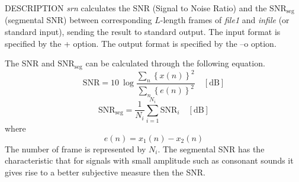 \begin{qsection}{DESCRIPTION}
{\em srn} calculates the SNR (Signal to Noise Ratio) 
and the $\mathrm{SNR}_{\mathrm{seg}}$ (segmental SNR) 
between corresponding $L$-length frames
of {\em file1} and {\em infile} (or standard input), 
sending the result to standard output.
The input format is specified by the + option.
The output format is specified by the --o option.

The SNR and $\mathrm{SNR}_{\mathrm{seg}}$ can be calculated
through the following equation.
\begin{displaymath}
\mathrm{SNR} = 10~\log \frac{\displaystyle\sum_{n} \left\{ x(n) \right\}^{2}}
{\displaystyle\sum_{n} \left\{ e(n) \right\}^{2}} \quad \mathrm{[dB]}
\end{displaymath}
\begin{displaymath}
\mathrm{SNR}_{\mathrm{seg}} = \frac{1}{N_{i}} \sum_{i = 1}^{N_{i}}
\mathrm{SNR}_{i} \quad \mathrm{[dB]}
\end{displaymath}
where
\begin{displaymath}
e(n) = x_1(n) - x_2(n)
\end{displaymath}
The number of frame is represented by $N_i$.
The segmental SNR has the characteristic that
for signals with small amplitude such as consonant sounds
it gives rise to a better
subjective measure then the SNR.
\end{qsection}

\newpage
\begin{options}
\end{options}

